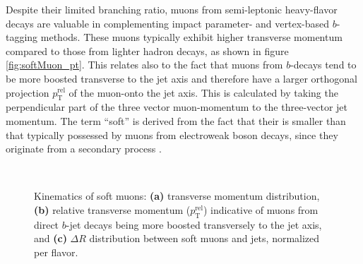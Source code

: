 Despite their limited branching ratio, muons from semi-leptonic heavy-flavor decays are valuable in complementing impact parameter- and vertex-based $b$-tagging methods. These muons typically exhibit higher transverse momentum compared to those from lighter hadron decays, as shown in figure \ref{fig:softMuon_pt}. This relates also to the fact that muons from $b$-decays tend to be more boosted transverse to the jet axis and therefore have a larger orthogonal projection $p_\text{T}^\text{rel}$ of the muon-\pt onto the jet axis. This is calculated by taking the perpendicular part of the three vector muon-momentum to the three-vector jet momentum. The term ``soft'' is derived from the fact that their \pt is smaller than that typically possessed by muons from electroweak boson decays, since they originate from a secondary process \citep{ATL-PHYS-PUB-2017-013}.
\begin{figure}[]
  \centering
  \hspace*{0.5cm}
  \\
  \caption{Kinematics of soft muons: \textbf{(a)} transverse momentum distribution, \textbf{(b)} relative transverse momentum ($p_\text{T}^\text{rel}$) indicative of muons from direct $b$-jet decays being more boosted transversely to the jet axis, and \textbf{(c)} $\Delta R$ distribution between soft muons and jets, normalized per flavor.}
  \label{fig:muonsForSMT}
\end{figure}



